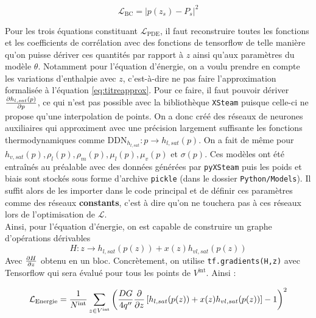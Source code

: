 \begin{equation}
    \mathcal{L}_{\text{BC}} = \left| p(z_s) - P_s\right|^2
\end{equation}

Pour les trois équations constituant $\mathcal{L}_{\text{PDE}}$, il faut reconstruire toutes les fonctions et les coefficients de corrélation avec des fonctions de tensorflow de telle manière qu'on puisse dériver ces quantités par rapport à $z$ ainsi qu'aux paramètres du modèle $\theta$. Notamment pour l'équation d'énergie, on a voulu prendre en compte les variations d'enthalpie avec $z$, c'est-à-dire ne pas faire l'approximation formalisée à l'équation \ref{eq:titreapprox}. Pour ce faire, il faut pouvoir dériver $\pder[h_{l,sat}(p)]{p}$, ce qui n'est pas possible avec la bibliothèque \verb|XSteam| puisque celle-ci ne propose qu'une interpolation de points. On a donc créé des réseaux de neurones auxiliaires qui approximent avec une précision largement suffisante les fonctions thermodynamiques comme $\text{DDN}_{h_{l,sat}} : p \rightarrow h_{l,sat}(p)$. On a fait de même pour $h_{v,sat}(p),\rho_l(p),\rho_m(p),\mu_l(p),\mu_v(p)$ et $\sigma(p)$. Ces modèles ont été entraînés au préalable avec des données générées par \verb|pyXSteam| puis les poids et biais sont stockés sous forme d'archive \verb|pickle| (dans le dossier \verb|Python/Models|). Il suffit alors de les importer dans le code principal et de définir ces paramètres comme des réseaux \textbf{constants}, c'est à dire qu'on ne touchera pas à ces réseaux lors de l'optimisation de $\mathcal{L}$.\\

Ainsi, pour l'équation d'énergie, on est capable de construire un graphe d'opérations dérivables 
\begin{equation}
    H : z \rightarrow h_{l,sat}(p(z)) + x(z)h_{vl,sat}(p(z))
\end{equation}
Avec $\pder[H]{z}$ obtenu en un bloc. Concrètement, on utilise \verb|tf.gradients(H,z)| avec Tensorflow qui sera évalué pour tous les points de $V^{\text{int}}$. Ainsi :

\begin{equation}
    \mathcal{L}_{\text{Energie}} =\frac{1}{N^{\text{int}}}\sum_{z\in V^{\text{int}}} \left( \frac{DG}{4q''}\pder{z}\left[ h_{l,sat}(p(z)) + x(z)h_{vl,sat}(p(z)) \right] -1  \right)^2
    \label{eq:titrednn}
\end{equation}

